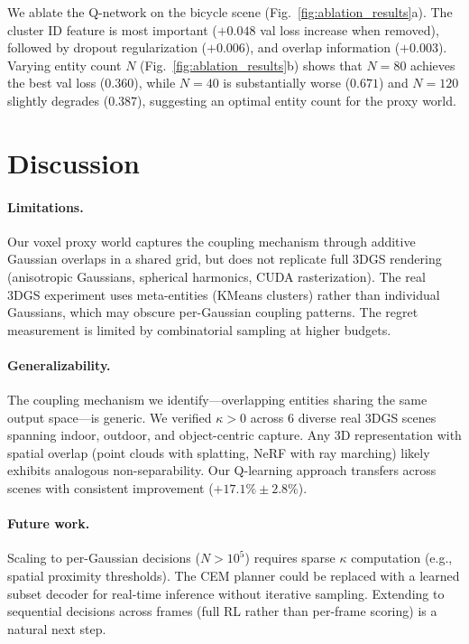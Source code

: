\documentclass[10pt,twocolumn]{article}
\begin{document}
We ablate the Q-network on the bicycle scene (Fig.~\ref{fig:ablation_results}a). The cluster ID feature is most important ($+0.048$ val loss increase when removed), followed by dropout regularization ($+0.006$), and overlap information ($+0.003$). Varying entity count $N$ (Fig.~\ref{fig:ablation_results}b) shows that $N=80$ achieves the best val loss ($0.360$), while $N=40$ is substantially worse ($0.671$) and $N=120$ slightly degrades ($0.387$), suggesting an optimal entity count for the proxy world.

\section{Discussion}

\paragraph{Limitations.} Our voxel proxy world captures the coupling mechanism through additive Gaussian overlaps in a shared grid, but does not replicate full 3DGS rendering (anisotropic Gaussians, spherical harmonics, CUDA rasterization). The real 3DGS experiment uses meta-entities (KMeans clusters) rather than individual Gaussians, which may obscure per-Gaussian coupling patterns. The regret measurement is limited by combinatorial sampling at higher budgets.

\paragraph{Generalizability.} The coupling mechanism we identify---overlapping entities sharing the same output space---is generic. We verified $\kappa > 0$ across 6 diverse real 3DGS scenes spanning indoor, outdoor, and object-centric capture. Any 3D representation with spatial overlap (point clouds with splatting, NeRF with ray marching) likely exhibits analogous non-separability. Our Q-learning approach transfers across scenes with consistent improvement ($+17.1\% \pm 2.8\%$).

\paragraph{Future work.} Scaling to per-Gaussian decisions ($N > 10^5$) requires sparse $\kappa$ computation (e.g., spatial proximity thresholds). The CEM planner could be replaced with a learned subset decoder for real-time inference without iterative sampling. Extending to sequential decisions across frames (full RL rather than per-frame scoring) is a natural next step.
\end{document}
